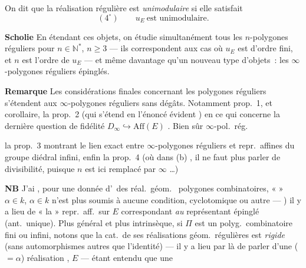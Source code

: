 \documentclass[11pt,a4paper]{article}
\begin{document}
 

On dit que la réalisation régulière est \emph{unimodulaire} si elle satisfait
\[
  (4^{\circ})\qquad u_E \ \text{est unimodulaire.}
\]

\textbf{Scholie} En étendant ces objets, on étudie simultanément tous les $n$-polygones réguliers  pour $n \in \mathbb{N}^{*}$, $n \geq 3$ --- ils correspondent aux cas où $u_E$ est d'ordre fini, et $n$ est l'ordre de $u_E$ --- et même davantage qu'un nouveau type d'objets~: les $\infty$-polygones réguliers épinglés.

\textbf{Remarque} Les considérations finales concernant les polygones réguliers s'étendent aux $\infty$-polygones réguliers sans \ill{} dégâts. Notamment  prop.~1, et corollaire, la prop.~2 (qui s'étend en l'énoncé évident ) en ce qui concerne la dernière question de fidélité $D_\infty \hookrightarrow \mathrm{Aff}(E)$   . Bien sûr $\infty$-pol.\ rég.


la prop.~3 \struck{\ill{}} montrant le lien exact entre $\infty$-polygones réguliers et repr.\ affines du groupe diédral infini, enfin la prop.~4 (où dans (b) , il ne faut plus parler de divisibilité, puisque $n$ est ici remplacé par $\infty$ …)

\textbf{NB} J'ai , pour une donnée d'\ des réal.\ géom.\   polygones combinatoires, \struck{\ill{}}  « \ill{} » $\alpha \in k$,  $\alpha \in k$ n'est plus soumis à aucune condition, cyclotomique ou autre --- ) il y a lieu de  « la » repr.\ aff.\ sur $E$ correspondant \emph{au} représentant épinglé (ant.\ unique). Plus général et plus intrinsèque, si $\Pi$ est un polyg.\ combinatoire fini ou infini, notons que la cat.\ de ses réalisations géom.\ régulières est \emph{rigide} (sans automorphismes autres que l'identité) --- il y a lieu par là de parler d'une ( $= \alpha$) réalisation , $E$ --- étant entendu que  une
\end{document}
